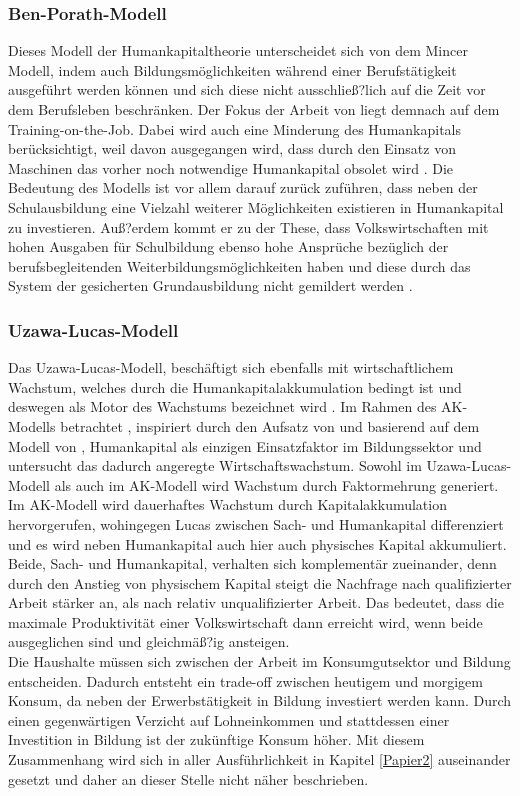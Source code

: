 \subsubsection*{Ben-Porath-Modell}
Dieses Modell der Humankapitaltheorie unterscheidet sich von dem Mincer Modell, indem auch Bildungsmöglichkeiten während einer Berufstätigkeit ausgeführt werden können und sich diese nicht ausschließ?lich auf die Zeit vor dem Berufsleben beschränken. Der Fokus der Arbeit von \cite{BenPorath.1967} liegt demnach auf dem Training-on-the-Job. Dabei wird auch eine Minderung des Humankapitals berücksichtigt, weil  davon ausgegangen wird, dass durch den Einsatz von Maschinen das vorher noch notwendige Humankapital obsolet wird \cite{BenPorath.1967,Heckman.1998,Guvenen.2012,Manuelli.2014}. Die Bedeutung des Modells ist vor allem darauf zurück zuführen, dass neben der Schulausbildung eine Vielzahl weiterer Möglichkeiten existieren in Humankapital zu investieren. Auß?erdem kommt er zu der These, dass Volkswirtschaften mit hohen Ausgaben für Schulbildung ebenso hohe Ansprüche bezüglich der berufsbegleitenden Weiterbildungsmöglichkeiten haben und diese durch das System der gesicherten Grundausbildung nicht gemildert werden \cite{BenPorath.1967}.
%
\subsubsection*{Uzawa-Lucas-Modell}
Das Uzawa-Lucas-Modell, beschäftigt sich ebenfalls mit wirtschaftlichem Wachstum, welches durch die Humankapitalakkumulation bedingt ist und deswegen als Motor des Wachstums bezeichnet wird \cite{Lucas.1988}. Im Rahmen des AK-Modells \cite{Rebelo.1991} betrachtet \cite{Lucas.1988}, inspiriert durch den Aufsatz von \cite{Becker.1964} und basierend auf dem Modell von \cite{Uzawa.1965}, Humankapital als einzigen Einsatzfaktor im Bildungssektor und untersucht das dadurch angeregte Wirtschaftswachstum. Sowohl im Uzawa-Lucas-Modell als auch im AK-Modell wird Wachstum durch Faktormehrung generiert. Im AK-Modell wird dauerhaftes Wachstum durch Kapitalakkumulation hervorgerufen, wohingegen Lucas zwischen Sach- und Humankapital differenziert und es wird neben Humankapital auch hier auch physisches Kapital akkumuliert. Beide, Sach- und Humankapital, verhalten sich komplementär zueinander, denn durch den Anstieg von physischem Kapital steigt die Nachfrage nach qualifizierter Arbeit stärker an, als nach relativ unqualifizierter Arbeit. Das bedeutet, dass die maximale Produktivität einer Volkswirtschaft dann erreicht wird, wenn beide ausgeglichen sind und gleichmäß?ig ansteigen.\\
%
Die Haushalte müssen sich zwischen der Arbeit im Konsumgutsektor und Bildung entscheiden. Dadurch entsteht ein trade-off zwischen heutigem und morgigem Konsum, da neben der Erwerbstätigkeit in Bildung investiert werden kann. Durch einen gegenwärtigen Verzicht auf Lohneinkommen und stattdessen einer Investition in Bildung ist der zukünftige Konsum höher. Mit diesem Zusammenhang wird sich in aller Ausführlichkeit in Kapitel \ref{Papier2} auseinander gesetzt und daher an dieser Stelle nicht näher beschrieben.
%
